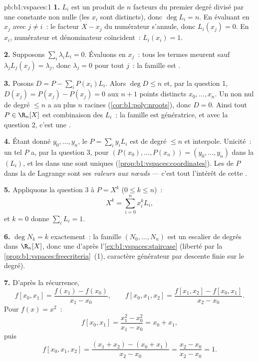 \begin{solution}{pb:b1:vspaces:1}
\textbf{1.} $L_i$ est un produit de $n$ facteurs du premier degré
divisé par une constante non nulle (les $x_i$ sont distincts), donc
$\deg L_i = n$. En évaluant en $x_j$ avec $j \neq i$~: le facteur $X -
x_j$ du numérateur s'annule, donc $L_i(x_j) = 0$. En $x_i$, numérateur
et dénominateur coïncident~: $L_i(x_i) = 1$.

\textbf{2.} Supposons $\sum_i \lambda_i L_i = 0$. Évaluons en $x_j$~:
tous les termes meurent sauf $\lambda_j L_j(x_j) = \lambda_j$, donc
$\lambda_j = 0$ pour tout $j$~: la famille est .

\textbf{3.} Posons $D = P - \sum_i P(x_i) L_i$. Alors $\deg D \leq n$
et, par la question 1, $D(x_j) = P(x_j) - P(x_j) = 0$ aux $n + 1$
points distincts $x_0, \dots, x_n$. Un  non nul de degré
$\leq n$ a au plus $n$ racines (\cref{cor:b1:poly:nroots}), donc $D
= 0$. Ainsi tout $P \in \R_n[X]$ est combinaison des $L_i$~: la
famille est génératrice, et avec la question 2, c'est une .

\textbf{4.} Étant donné $y_0, \dots, y_n$, le  $P = \sum_i
y_i L_i$ est de degré $\leq n$ et interpole. Unicité~: un tel $P$ a,
par la question 3, pour  $(P(x_0), \dots,
P(x_n)) = (y_0, \dots, y_n)$ dans la  $(L_i)$, et les 
dans une  sont uniques (\cref{prop:b1:vspaces:coordinates}). Les
 de $P$ dans la  de Lagrange sont ses \emph{valeurs aux
nœuds} --- c'est tout l'intérêt de cette .

\textbf{5.} Appliquons la question 3 à $P = X^k$ ($0 \leq k \leq n$)~:
\[
X^k = \sum_{i=0}^{n} x_i^{k} L_i ,
\]
et $k = 0$ donne $\sum_i L_i = 1$.

\textbf{6.} $\deg N_k = k$ exactement~: la famille $(N_0, \dots, N_n)$
est un escalier de degrés dans $\R_n[X]$, donc une  d'après
l'\cref{ex:b1:vspaces:staircase} (liberté par
la \cref{prop:b1:vspaces:freecriteria}~(1), caractère générateur par
descente finie sur le degré).

\textbf{7.} D'après la récurrence,
\[
f[x_0, x_1] = \frac{f(x_1) - f(x_0)}{x_1 - x_0},
\qquad
f[x_0, x_1, x_2] = \frac{f[x_1, x_2] - f[x_0, x_1]}{x_2 - x_0}.
\]
Pour $f(x) = x^2$~:
\[
f[x_0, x_1] = \frac{x_1^2 - x_0^2}{x_1 - x_0} = x_0 + x_1,
\]
puis
\[
f[x_0, x_1, x_2]
= \frac{(x_1 + x_2) - (x_0 + x_1)}{x_2 - x_0}
= \frac{x_2 - x_0}{x_2 - x_0} = 1 .
\]


\end{solution}
